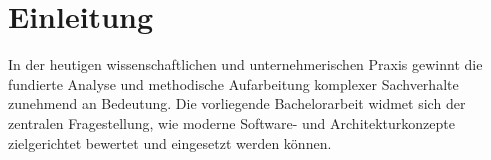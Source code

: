 
\section{Einleitung}
\label{sec:einleitung}


In der heutigen wissenschaftlichen und unternehmerischen Praxis gewinnt die fundierte Analyse und methodische Aufarbeitung komplexer Sachverhalte zunehmend an Bedeutung. Die vorliegende Bachelorarbeit widmet sich der zentralen Fragestellung, wie moderne Software- und Architekturkonzepte zielgerichtet bewertet und eingesetzt werden können.

\lipsum[1-2]
\lipsum[1-2]